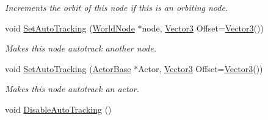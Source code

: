 \begin{DoxyCompactItemize}
\begin{DoxyCompactList}\small\item\em Increments the orbit of this node if this is an orbiting node. \item\end{DoxyCompactList}\item 
void \hyperlink{classphys_1_1WorldNode_a3c8447cd6de0af06a6004cdd968671f0}{SetAutoTracking} (\hyperlink{classphys_1_1WorldNode}{WorldNode} $\ast$node, \hyperlink{classphys_1_1Vector3}{Vector3} Offset=\hyperlink{classphys_1_1Vector3}{Vector3}())
\begin{DoxyCompactList}\small\item\em Makes this node autotrack another node. \item\end{DoxyCompactList}\item 
void \hyperlink{classphys_1_1WorldNode_a3bd06b9d4a4baa6937a8a3a33a33b047}{SetAutoTracking} (\hyperlink{classphys_1_1ActorBase}{ActorBase} $\ast$Actor, \hyperlink{classphys_1_1Vector3}{Vector3} Offset=\hyperlink{classphys_1_1Vector3}{Vector3}())
\begin{DoxyCompactList}\small\item\em Makes this node autotrack an actor. \item\end{DoxyCompactList}\item 
\hypertarget{classphys_1_1WorldNode_aec20d9b24a8de76a227307a9d287d127}{
void \hyperlink{classphys_1_1WorldNode_aec20d9b24a8de76a227307a9d287d127}{DisableAutoTracking} ()}
\label{classphys_1_1WorldNode_aec20d9b24a8de76a227307a9d287d127}


\end{DoxyCompactItemize}
